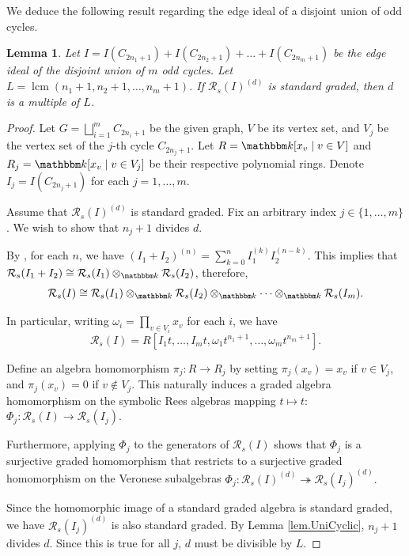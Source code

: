 \documentclass[12pt]{amsart}
\numberwithin{equation}{section}
\newtheorem{lemma}[theorem]{Lemma}
\theoremstyle{definition}
\DeclareMathOperator{\lcm}{lcm}
\newcommand{\kk}{{\mathbbm k}}
\begin{document}
We deduce the following result regarding the edge ideal of a disjoint union of odd cycles.

\begin{lemma}
\label{lem.DisjointCycles}
Let $I = I(C_{2n_1+1}) + I(C_{2n_2+1}) + \dots + I(C_{2n_m+1})$ be the edge ideal of the disjoint union of $m$ odd cycles. Let $L = \lcm(n_1+1, n_2+1, \dots, n_m+1)$. If $\mathcal{R}_s(I)^{(d)}$ is standard graded, then $d$ is a multiple of $L$.
\end{lemma}


\begin{proof}
Let $G = \bigsqcup_{i=1}^m C_{2n_i+1}$ be the given graph, $V$ be its vertex set, and $V_j$ be the vertex set of the $j$-th cycle $C_{2n_j+1}$. Let $R = \kk[x_v \mid v \in V]$ and $R_j = \kk[x_v \mid v \in V_j]$ be their respective polynomial rings. Denote $I_j=I(C_{2n_j+1})$ for each $j=1,\ldots ,m$.

Assume that $\mathcal{R}_s(I)^{(d)}$ is standard graded. Fix an arbitrary index $j \in \{1, \dots, m\}$. We wish to show that $n_j+1$ divides $d$. 

By \cite[Theorem 3.4]{HNTT20}, for each $n$, we have $(I_1 + I_2)^{(n)} = \sum_{k=0}^n I_1^{(k)} I_2^{(n-k)}$. 
This implies that $\mathcal{R}_s(I_1 + I_2) \cong \mathcal{R}_s(I_1) \otimes_\kk \mathcal{R}_s(I_2)$, 
therefore, 
$$\mathcal{R}_s(I) \cong \mathcal{R}_s(I_1) \otimes_\kk \mathcal{R}_s(I_2) \otimes_\kk \cdots  \otimes_\kk \mathcal{R}_s(I_m).$$

In particular, writing $\omega_i = \prod_{v\in V_i} x_v$ for each $i$, we have
$$\mathcal{R}_s(I) = R \left[I_1 t, \ldots , I_m t, \omega_1 t^{n_1+1}, \ldots, \omega_m t^{n_m+1} \right].$$

Define an algebra homomorphism $\pi_j: R \to R_j$ by setting $\pi_j(x_v) = x_v$ if $v \in V_j$, and $\pi_j(x_v) = 0$ if $v \notin V_j$. This naturally induces a graded algebra homomorphism on the symbolic Rees algebras mapping $t \mapsto t$:
$\Phi_j: \mathcal{R}_s(I) \to \mathcal{R}_s(I_j)$.

Furthermore, applying $\Phi_j$ to the generators of $\mathcal{R}_s(I)$ shows that $\Phi_j$ is a surjective graded homomorphism that restricts to a surjective graded homomorphism on the Veronese subalgebras
$\Phi_j: \mathcal{R}_s(I)^{(d)} \twoheadrightarrow \mathcal{R}_s(I_j)^{(d)}.$

Since the homomorphic image of a standard graded algebra is standard graded, we have $\mathcal{R}_s(I_j)^{(d)}$ is also standard graded. By Lemma \ref{lem.UniCyclic}, $n_j+1$ divides $d$. Since this is true for all $j$, $d$ must be divisible by $L$.
\end{proof}
\end{document}
